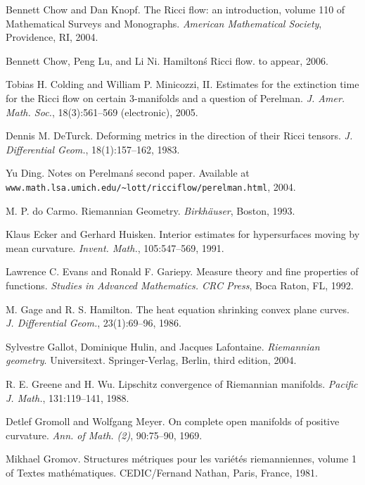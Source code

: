 \begin{thebibliography}{99}
    Bennett Chow and Dan Knopf. The Ricci flow: an introduction, volume 110 of Mathematical Surveys and Monographs. \textit{American Mathematical Society}, Providence, RI, 2004.
    
    Bennett Chow, Peng Lu, and Li Ni. Hamilton\'s Ricci flow. to appear, 2006.
    
    Tobias H. Colding and William P. Minicozzi, II. Estimates for the extinction time for the Ricci flow on certain 3-manifolds and a question of Perelman. \textit{J. Amer. Math. Soc.}, 18(3):561–569 (electronic), 2005.
    
    Dennis M. DeTurck. Deforming metrics in the direction of their Ricci tensors. \textit{J. Differential Geom.}, 18(1):157–162, 1983.
    
    Yu Ding. Notes on Perelman\'s second paper. Available at \texttt{www.math.lsa.umich.edu/\~{}lott/ricciflow/perelman.html}, 2004.
    
    M. P. do Carmo. Riemannian Geometry. \textit{Birkhäuser}, Boston, 1993.
    
    Klaus Ecker and Gerhard Huisken. Interior estimates for hypersurfaces moving by mean curvature. \textit{Invent. Math.}, 105:547–569, 1991.
    
    Lawrence C. Evans and Ronald F. Gariepy. Measure theory and fine properties of functions. \textit{Studies in Advanced Mathematics. CRC Press}, Boca Raton, FL, 1992.
    
    M. Gage and R. S. Hamilton. The heat equation shrinking convex plane curves. \textit{J. Differential Geom.}, 23(1):69–96, 1986.
    
    Sylvestre Gallot, Dominique Hulin, and Jacques Lafontaine. \textit{Riemannian geometry}. Universitext. Springer-Verlag, Berlin, third edition, 2004.

    R. E. Greene and H. Wu. Lipschitz convergence of Riemannian manifolds. \textit{Pacific J. Math.}, 131:119–141, 1988.

    Detlef Gromoll and Wolfgang Meyer. On complete open manifolds of positive curvature. \textit{Ann. of Math. (2)}, 90:75–90, 1969.

    Mikhael Gromov. Structures métriques pour les variétés riemanniennes, volume 1 of Textes mathématiques. CEDIC/Fernand Nathan, Paris, France, 1981.


\end{thebibliography}
